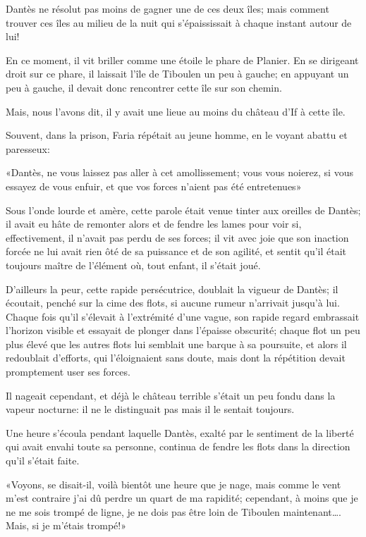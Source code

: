 Dantès ne résolut pas moins de gagner une de ces deux îles; mais comment trouver ces îles au milieu de la nuit qui s'épaississait à chaque instant autour de lui!

En ce moment, il vit briller comme une étoile le phare de Planier. En se dirigeant droit sur ce phare, il laissait l'île de Tiboulen un peu à gauche; en appuyant un peu à gauche, il devait donc rencontrer cette île sur son chemin.

Mais, nous l'avons dit, il y avait une lieue au moins du château d'If à cette île.

Souvent, dans la prison, Faria répétait au jeune homme, en le voyant abattu et paresseux:

«Dantès, ne vous laissez pas aller à cet amollissement; vous vous noierez, si vous essayez de vous enfuir, et que vos forces n'aient pas été entretenues»

Sous l'onde lourde et amère, cette parole était venue tinter aux oreilles de Dantès; il avait eu hâte de remonter alors et de fendre les lames pour voir si, effectivement, il n'avait pas perdu de ses forces; il vit avec joie que son inaction forcée ne lui avait rien ôté de sa puissance et de son agilité, et sentit qu'il était toujours maître de l'élément où, tout enfant, il s'était joué.

D'ailleurs la peur, cette rapide persécutrice, doublait la vigueur de Dantès; il écoutait, penché sur la cime des flots, si aucune rumeur n'arrivait jusqu'à lui. Chaque fois qu'il s'élevait à l'extrémité d'une vague, son rapide regard embrassait l'horizon visible et essayait de plonger dans l'épaisse obscurité; chaque flot un peu plus élevé que les autres flots lui semblait une barque à sa poursuite, et alors il redoublait d'efforts, qui l'éloignaient sans doute, mais dont la répétition devait promptement user ses forces.

Il nageait cependant, et déjà le château terrible s'était un peu fondu dans la vapeur nocturne: il ne le distinguait pas mais il le sentait toujours.

Une heure s'écoula pendant laquelle Dantès, exalté par le sentiment de la liberté qui avait envahi toute sa personne, continua de fendre les flots dans la direction qu'il s'était faite.

«Voyons, se disait-il, voilà bientôt une heure que je nage, mais comme le vent m'est contraire j'ai dû perdre un quart de ma rapidité; cependant, à moins que je ne me sois trompé de ligne, je ne dois pas être loin de Tiboulen maintenant\dots. Mais, si je m'étais trompé!»

